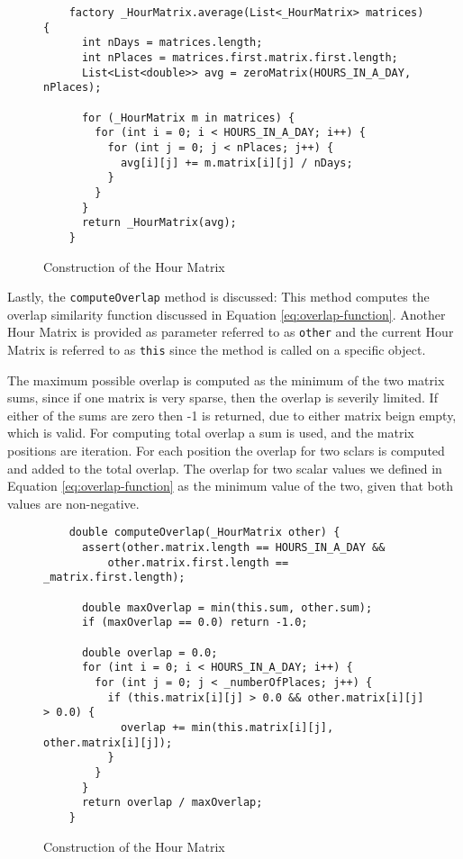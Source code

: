 \begin{figure}
    \centering
    \begin{verbatim}
    factory _HourMatrix.average(List<_HourMatrix> matrices) {
      int nDays = matrices.length;
      int nPlaces = matrices.first.matrix.first.length;
      List<List<double>> avg = zeroMatrix(HOURS_IN_A_DAY, nPlaces);
    
      for (_HourMatrix m in matrices) {
        for (int i = 0; i < HOURS_IN_A_DAY; i++) {
          for (int j = 0; j < nPlaces; j++) {
            avg[i][j] += m.matrix[i][j] / nDays;
          }
        }
      }
      return _HourMatrix(avg);
    }
    \end{verbatim}
    \caption{Construction of the Hour Matrix}
    \label{fig:hour-matrix-average}
\end{figure}

Lastly, the \verb|computeOverlap| method is discussed: This method computes the overlap similarity function discussed in Equation \ref{eq:overlap-function}. Another Hour Matrix is provided as parameter referred to as \verb|other| and the current Hour Matrix is referred to as \verb|this| since the method is called on a specific object. 

The maximum possible overlap is computed as the minimum of the two matrix sums, since if one matrix is very sparse, then the overlap is severily limited. If either of the sums are zero then -1 is returned, due to either matrix beign empty, which is valid. For computing total overlap a sum is used, and the matrix positions are iteration. For each position the overlap for two sclars is computed and added to the total overlap. The overlap for two scalar values we defined in Equation \ref{eq:overlap-function} as the minimum value of the two, given that both values are non-negative. 

\begin{figure}
    \centering
    \begin{verbatim}
    double computeOverlap(_HourMatrix other) {
      assert(other.matrix.length == HOURS_IN_A_DAY &&
          other.matrix.first.length == _matrix.first.length);
    
      double maxOverlap = min(this.sum, other.sum);
      if (maxOverlap == 0.0) return -1.0;
    
      double overlap = 0.0;
      for (int i = 0; i < HOURS_IN_A_DAY; i++) {
        for (int j = 0; j < _numberOfPlaces; j++) {
          if (this.matrix[i][j] > 0.0 && other.matrix[i][j] > 0.0) {
            overlap += min(this.matrix[i][j], other.matrix[i][j]);
          }
        }
      }
      return overlap / maxOverlap;
    }
    \end{verbatim}
    \caption{Construction of the Hour Matrix}
    \label{fig:hour-matrix-overlap}
\end{figure}


